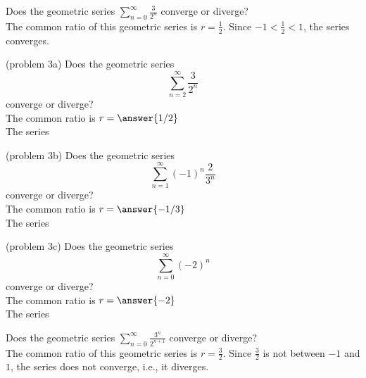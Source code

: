 \documentclass{ximera}
\begin{document}
\begin{example}[example 3]
Does the geometric series $\displaystyle{\sum_{n=0}^\infty \frac{3}{2^n}}$ converge or diverge?\\
The common ratio of this geometric series is $r = \frac12$. Since $-1 < \frac 12 < 1$,
the series converges.
\end{example}


\begin{problem}(problem 3a)
 Does the geometric series
 \[
 \sum_{n=2}^\infty \frac{3}{2^n} 
 \]
 converge or diverge?\\
 The common ratio is $r = \answer{1/2}$\\
 The series
 \begin{multipleChoice}
 \end{multipleChoice}
 \end{problem}
 

\begin{problem}(problem 3b)
 Does the geometric series
 \[
 \sum_{n=1}^\infty (-1)^n\frac{2}{3^n} 
 \]
 converge or diverge?\\
 The common ratio is $r = \answer{-1/3}$\\
 The series
 \begin{multipleChoice}
 \end{multipleChoice}
 \end{problem}
 
 \begin{problem}(problem 3c)
 Does the geometric series
 \[
 \sum_{n=0}^\infty (-2)^n 
 \]
 converge or diverge?\\
 The common ratio is $r = \answer{-2}$\\
 The series
 \begin{multipleChoice}
 \end{multipleChoice}
 \end{problem}
 
 
 
 
\begin{example}[example 4]
Does the geometric series $\displaystyle{\sum_{n=0}^\infty \frac{3^n}{2^{n+1}}}$ converge or diverge?\\
The common ratio of this geometric series is $r = \frac32$. Since $\frac32$ is not between $-1$ and $1$,
the series does not converge, i.e., it diverges.
\end{example}
\end{document}
